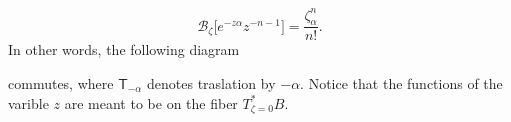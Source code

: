 \documentclass{article}
\newcommand{\maps}{\colon}
\newcommand{\C}{\mathbb{C}}
\newcommand{\laplace}{\mathcal{L}}
\newcommand{\borel}{\mathcal{B}}
\theoremstyle{definition}
\theoremstyle{plain}
\newtheorem{lemma}[definition]{Lemma}
\begin{document}
    \[\borel_{\zeta}\big[e^{-z\alpha}z^{-n-1}\big]=\frac{\zeta_\alpha^n}{n!}.\]
In other words, the following diagram 
    \begin{center}
\end{center}
commutes, where $\mathsf{T}_{-\alpha}$ denotes traslation by $-\alpha$. Notice that the functions of the varible $z$ are meant to be on the fiber $T^*_{\zeta=0}B$. 
\end{document}
